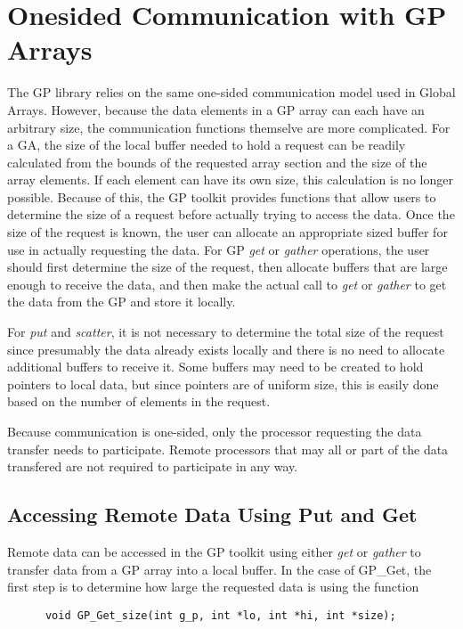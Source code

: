 \chapter{Onesided Communication with GP Arrays}

The GP library relies on the same one-sided communication model used in Global
Arrays. However, because the data elements in a GP array can each have an
arbitrary size, the communication functions themselve are more complicated. For
a GA, the size of the local buffer needed to hold a request can be readily
calculated from the bounds of the requested array section and the size of the
array elements. If each element can have its own size, this calculation is no
longer possible. Because of this, the GP toolkit provides functions that allow
users to determine the size of a request before actually trying to access the
data. Once the size of the request is known, the user can allocate an
appropriate sized buffer for use in actually requesting the data. For GP
\emph{get} or \emph{gather} operations, the user should first determine the size
of the request, then allocate buffers that are large enough to receive the data,
and then make the actual call to \emph{get} or \emph{gather} to get the data
from the GP and store it locally.

For \emph{put} and \emph{scatter}, it is not necessary to determine the total
size of the request since presumably the data already exists locally and there
is no need to allocate additional buffers to receive it. Some buffers may need to
be created to hold pointers to local data, but since pointers are of uniform size,
this is easily done based on the number of elements in the request.

Because communication is one-sided, only the processor requesting the data
transfer needs to participate. Remote processors that may all or part of the
data transfered are not required to participate in any way.

\section{Accessing Remote Data Using Put and Get}
Remote data can be accessed in the GP toolkit using either \emph{get} or
\emph{gather} to transfer data from a GP array into a local buffer. In the case
of GP\_Get, the first step is to determine how large the requested data is using
the function

\begin{verbatim}
      void GP_Get_size(int g_p, int *lo, int *hi, int *size);
\end{verbatim}

